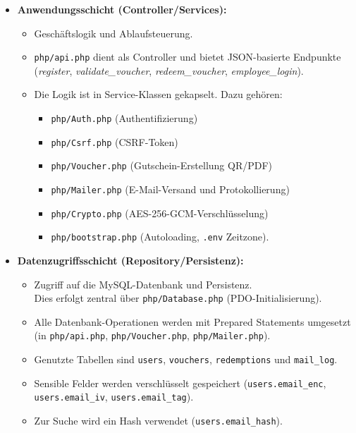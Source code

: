 \begin{itemize}
  \item \textbf{Anwendungsschicht (Controller/Services):}
        \renewcommand{\labelitemii}{$\rightarrow$} %
        \begin{itemize}
          \item Geschäftslogik und Ablaufsteuerung.
          \item\texttt{php/api.php} dient als Controller und bietet \ac{JSON}-basierte Endpunkte (\zB \textit{register}, \textit{validate\_voucher}, \textit{redeem\_voucher}, \textit{employee\_login}).
          \item Die Logik ist in Service-Klassen gekapselt. Dazu gehören:
                \begin{itemize}
                  \item \texttt{php/Auth.php} (Authentifizierung)
                  \item \texttt{php/Csrf.php} (\ac{CSRF}-Token)
                  \item \texttt{php/Voucher.php} (Gutschein-Erstellung \inkl QR/PDF)
                  \item \texttt{php/Mailer.php} (E-Mail-Versand und Protokollierung)
                  \item \texttt{php/Crypto.php} (\ac{AES}-256-GCM-Verschlüsselung)
                  \item \texttt{php/bootstrap.php} (Autoloading, \texttt{.env} Zeitzone).
                \end{itemize}
        \end{itemize}
        \newpage
  \item \textbf{Datenzugriffsschicht (Repository/Persistenz):}
        \renewcommand{\labelitemii}{$\rightarrow$} %
        \begin{itemize}
          \item Zugriff auf die MySQL-Datenbank und Persistenz.\\
                Dies erfolgt zentral über \texttt{php/Database.php} (PDO-Initialisierung).
          \item Alle Datenbank-Operationen werden mit Prepared Statements umgesetzt (\zB in \texttt{php/api.php}, \texttt{php/Voucher.php}, \texttt{php/Mailer.php}).
          \item Genutzte Tabellen sind \texttt{users}, \texttt{vouchers},  \texttt{redemptions} und \texttt{mail\_log}.
          \item Sensible Felder werden verschlüsselt gespeichert (\texttt{users.email\_enc}, \texttt{users.email\_iv}, \texttt{users.email\_tag}).
          \item Zur Suche wird ein Hash verwendet (\texttt{users.email\_hash}).
        \end{itemize}
\end{itemize}

